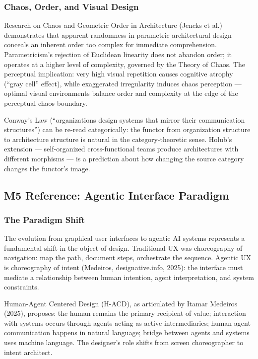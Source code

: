 \documentclass[11pt,letterpaper]{article}
\begin{document}
\subsubsection{Chaos, Order, and Visual Design}

Research on Chaos and Geometric Order in Architecture (Jencks et al.) demonstrates that apparent randomness in parametric architectural design conceals an inherent order too complex for immediate comprehension. Parametricism's rejection of Euclidean linearity does not abandon order; it operates at a higher level of complexity, governed by the Theory of Chaos. The perceptual implication: very high visual repetition causes cognitive atrophy (``gray cell'' effect), while exaggerated irregularity induces chaos perception --- optimal visual environments balance order and complexity at the edge of the perceptual chaos boundary.

Conway's Law (``organizations design systems that mirror their communication structures'') can be re-read categorically: the functor from organization structure to architecture structure is natural in the category-theoretic sense. Holub's extension --- self-organized cross-functional teams produce architectures with different morphisms --- is a prediction about how changing the source category changes the functor's image.

\subsection{M5 Reference: Agentic Interface Paradigm}

\subsubsection{The Paradigm Shift}

The evolution from graphical user interfaces to agentic AI systems represents a fundamental shift in the object of design. Traditional UX was choreography of navigation: map the path, document steps, orchestrate the sequence. Agentic UX is choreography of intent (Medeiros, designative.info, 2025): the interface must mediate a relationship between human intention, agent interpretation, and system constraints.

Human-Agent Centered Design (H-ACD), as articulated by Itamar Medeiros (2025), proposes: the human remains the primary recipient of value; interaction with systems occurs through agents acting as active intermediaries; human-agent communication happens in natural language; bridge between agents and systems uses machine language. The designer's role shifts from screen choreographer to intent architect.
\end{document}
